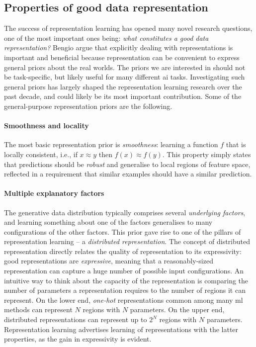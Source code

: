 \subsection{Properties of good data representation}
\label{ch3:sec:properties}


The success of representation learning has opened many novel research questions, one of the most important ones being: \textit{what constitutes a good data representation?}
Bengio \cite{Bengio2013RLR} argue that explicitly dealing with representations is important and beneficial because representation can be convenient to express general priors about the real worlds.
The priors we are interested in should not be task-specific, but likely useful for many different \gls{ai} tasks.
Investigating such general priors has largely shaped the representation learning research over the past decade, and could likely be its most important contribution.
Some of the general-purpose representation priors are the following.



\paragraph{\textbf{Smoothness and locality}}
The most basic representation prior is \textit{smoothness}: learning a function $f$ that is locally consistent, i.e., if $ x \approx y$ then $f(x) \approx f(y)$.
This property simply states that predictions should be \textit{robust} and generalise to local regions of feature space, reflected in a requirement that similar examples should have a similar prediction.




\paragraph{\textbf{Multiple explanatory factors}}
The generative data distribution typically comprises several \textit{underlying factors}, and learning something about one of the factors generalises to many configurations of the other factors.
This prior gave rise to one of the pillars of representation learning -- a  \textit{distributed representation}.
The concept of distributed representation directly relates the quality of representation to its expressivity: good representations are \textit{expressive}, meaning that a reasonably-sized representation can capture a huge number of possible input configurations.
An intuitive way to think about the capacity of the representation is comparing the number of parameters a representation requires to the number of regions it can represent.
On the lower end, \textit{one-hot} representations common among many \gls{ml} methods can represent $N$ regions with $N$ parameters.
On the upper end, distributed representations can represent up to $2^N$ regions with $N$ parameters.
Representation learning advertises learning of representations with the latter properties, as the gain in expressivity is evident.



